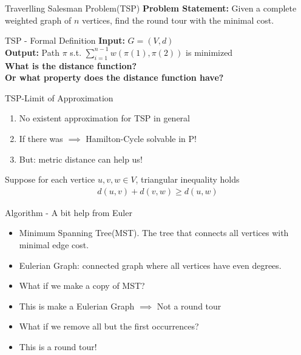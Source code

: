 \documentclass{beamer}
\begin{document}

\begin{frame}{Traverlling Salesman Problem(TSP)}
    \textbf{Problem Statement:} Given a complete weighted graph of $n$ vertices, find the round tour with the minimal cost. 
\end{frame}

\begin{frame}{TSP - Formal Definition}
    \textbf{Input:} $G = (V, d)$ \\
    \textbf{Output:} Path $\pi$ s.t. $\sum_{i = 1}^{n-1} w(\pi(1), \pi(2))$
    is minimized \\[20pt]
    \pause 
    \textbf{What is the distance function? \\ Or what property does the distance function have?}
\end{frame}

\begin{frame}{TSP-Limit of Approximation}
    \begin{enumerate}
        \item<1-3> No existent approximation for TSP in general 
        \item<2-3> If there was $\implies$ Hamilton-Cycle solvable in P!
        \item<3> But: metric distance can help us!
    \end{enumerate}
    \pause 
    Suppose for each vertice $u, v, w \in V$, triangular inequality holds
    \begin{align*}
        d(u, v) + d(v, w) \geq d(u, w)
    \end{align*}
\end{frame}

\begin{frame}{Algorithm - A bit help from Euler}
    \begin{itemize}
        \item<1-2> Minimum Spanning Tree(MST). The tree that connects all vertices with minimal edge cost.
        \item<2> Eulerian Graph: connected graph where all vertices have even degrees.
        \item<3-> What if we make a copy of MST?
        \item<4-> This is make a Eulerian Graph $\implies$ Not a round tour 
        \item<5-> What if we remove all but the first occurrences?
        \item<6-> This is a round tour!
    \end{itemize}
\end{frame}
\end{document}
